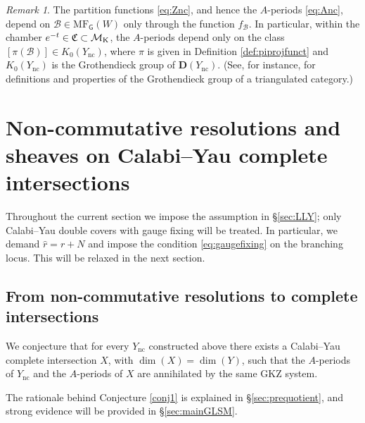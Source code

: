 \documentclass[12pt,a4paper,oneside]{amsart}
\numberwithin{equation}{section}
\theoremstyle{definition}
\theoremstyle{remark}
\newtheorem{rmk}[thm]{Remark}
\newcommand{\mM}{\mathcal{M}}
\newcommand{\sG}{\mathsf{G}}
\newcommand{\Br}{\mathcal{B}}
\newcommand{\Ync}{Y_{\mathrm{nc}}}
\newcommand{\MF}{\mathrm{MF}}
\newcommand{\DC}{\mathbf{D}}
\begin{document}
\begin{rmk}\label{rem:K0}
    The partition functions \eqref{eq:Znc}, and hence the $A$-periods \eqref{eq:Anc}, depend on $\Br \in \MF_{\sG} (W)$ only through the function $f_{\Br}$. In particular, within the chamber $e^{-t} \in \mathfrak{C} \subset \mM_{\text{\rm K}}$, 
    the $A$-periods depend only on the class $[\pi (\Br)] \in K_0 (\Ync)$, where $\pi$ is given in Definition \ref{def:piprojfunct} and $K_0 (\Ync)$ is the Grothendieck group of $\DC (\Ync)$.
    (See, for instance, \cite{Neeman} for definitions and properties of the Grothendieck group of a triangulated category.)
\end{rmk}


\section{Non-commutative resolutions and sheaves on Calabi--Yau complete intersections}
\label{sec:maingeom}

Throughout the current section we impose the assumption in \S\ref{sec:LLY}; only
Calabi--Yau double covers with gauge fixing will be treated. 
In particular, we demand $\hat{r}=r+N$ and impose the condition \eqref{eq:gaugefixing} on the branching locus. This will be relaxed in the next section.

\subsection{From non-commutative resolutions to complete intersections}
We conjecture that for every $\Ync$ constructed above there exists a Calabi--Yau complete intersection $X$, with $\dim (X)= \dim (Y)$, such that the $A$-periods of $\Ync$ and the $A$-periods of $X$ are annihilated by the same GKZ system.\par
The rationale behind Conjecture \ref{conj1} is explained in \S\ref{sec:prequotient}, and strong evidence will be provided in \S\ref{sec:mainGLSM}.
\end{document}
